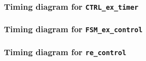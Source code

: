 \clearpage
\subsubsection{Timing diagram for \texttt{CTRL\_ex\_timer}}\label{app:figs:CTRL}
\begin{figure}[!htbp]
    \centering
\end{figure}

\clearpage
\subsubsection{Timing diagram for \texttt{FSM\_ex\_control}}\label{app:figs:FSM}
\begin{figure}[!htbp]
    \centering
\end{figure}

\clearpage
\subsubsection{Timing diagram for \texttt{re\_control}}\label{app:figs:re_control}
\begin{figure}[!htbp]
    \centering
\end{figure}